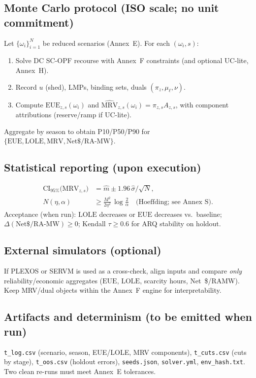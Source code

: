 \documentclass[11pt]{article}
\newcommand{\EUE}{\ensuremath{\mathrm{EUE}}}
\newcommand{\LOLE}{\ensuremath{\mathrm{LOLE}}}
\numberwithin{equation}{section}
\theoremstyle{definition}
\theoremstyle{remark}
\begin{document}
\subsection{Monte Carlo protocol (ISO scale; no unit commitment)}
Let $\{\omega_i\}_{i=1}^{N}$ be reduced scenarios (Annex~E). For each $(\omega_i,s)$:
\begin{enumerate}[leftmargin=1.2em]
  \item Solve DC SC-OPF recourse with Annex~F constraints (and optional UC-lite, Annex~H).
  \item Record $u$ (shed), LMPs, binding sets, duals $(\pi_z,\mu_\ell,\nu)$.
  \item Compute $\mathrm{EUE}_{z,s}(\omega_i)$ and $\widehat{\mathrm{MRV}}_{z,s}(\omega_i)=\pi_{z,s}A_{z,s}$, with component attributions (reserve/ramp if UC-lite).
\end{enumerate}
Aggregate by season to obtain P10/P50/P90 for $\{\mathrm{EUE},\mathrm{LOLE},\mathrm{MRV},\mathrm{Net}\$/\mathrm{RA\text{-}MW}\}$.

\subsection{Statistical reporting (upon execution)}
\begin{align}
\mathrm{CI}_{95\%}\big(\mathrm{MRV}_{z,s}\big) &= \widehat m \pm 1.96\,\widehat\sigma/\sqrt{N},\\
N(\eta,\alpha) &\ge \frac{M^2}{2\eta^2}\,\log\!\frac{2}{\alpha}\quad \text{(Hoeffding; see Annex~S)}.
\end{align}
Acceptance (when run): \LOLE{} decreases or \EUE{} decreases vs.\ baseline; $\Delta(\mathrm{Net}\$/\mathrm{RA\text{-}MW}) \ge 0$; Kendall $\tau \ge 0.6$ for ARQ stability on holdout.

\subsection{External simulators (optional)}
If PLEXOS or SERVM is used as a cross-check, align inputs and compare \emph{only} reliability/economic aggregates (\EUE{}, \LOLE{}, scarcity hours, Net~\$/RA\text{-}MW). Keep MRV/dual objects within the Annex~F engine for interpretability.

\subsection{Artifacts and determinism (to be emitted when run)}
\texttt{t\_log.csv} (scenario, season, EUE/LOLE, MRV components), \texttt{t\_cuts.csv} (cuts by stage), \texttt{t\_oos.csv} (holdout errors), \texttt{seeds.json}, \texttt{solver.yml}, \texttt{env\_hash.txt}. Two clean re-runs must meet Annex~E tolerances.
\end{document}
